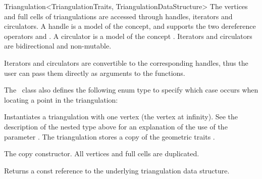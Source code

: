 \begin{ccRefClass}{Triangulation<TriangulationTraits, TriangulationDataStructure>}
The vertices and full cells of triangulations are accessed through handles,
iterators and circulators. A handle is a model of the  concept,
and supports the two dereference operators  and
. A circulator is a model of the concept .
Iterators and circulators are bidirectional and non-mutable.

Iterators and circulators are convertible to the corresponding handles, thus
the user can pass them directly as arguments to the functions.

\ccGlue{}

\ccGlue{}


\ccGlue{}

The \ccRefName\ class also defines the following enum type to specify
which case occurs when locating a point in the triangulation:


\ccCreation
{}

{Instantiates a triangulation with one vertex (the vertex at infinity). See the
description of the nested type  above for an
explanation of the use of the parameter . The triangulation stores a copy
of the geometric traits .}

{The copy constructor. All vertices and full cells are duplicated.}


%
{Returns a const reference to the underlying triangulation data structure.}


\end{ccRefClass}
